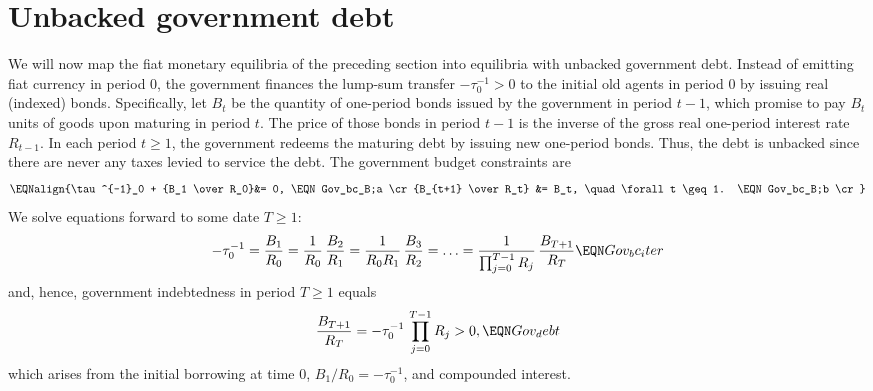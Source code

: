 

 \section{Unbacked government debt}
We will now map the fiat monetary equilibria of the preceding section 
into equilibria with unbacked government debt. Instead of emitting  
fiat currency in period $0$, the government finances the lump-sum transfer 
$-\tau^{-1}_0 >0$ to the initial old agents in period $0$ by 
issuing real (indexed) bonds. Specifically, let $B_{t}$ be the quantity of 
one-period bonds issued by the government in period $t-1$, 
which promise to pay $B_{t}$ units of goods upon maturing in period $t$. 
The price of those bonds in period $t-1$ is the inverse of the gross 
real one-period interest rate $R_{t-1}$. In each period $t \geq 1$, 
the government redeems the maturing debt by issuing new one-period bonds. 
Thus, the debt is unbacked since there are never any taxes levied to service 
the debt. The government budget constraints are 
$$\EQNalign{\tau^{-1}_0 + {B_1 \over R_0}&= 0,    \EQN Gov_bc_B;a \cr
                     {B_{t+1} \over R_t} &= B_t,  \quad \forall t \geq 1. 
                                                  \EQN Gov_bc_B;b \cr} $$
We solve equations  forward to some date $T\geq 1$:
$$ -\tau^{-1}_0 = {B_1 \over R_0} = {1 \over R_0}\, {B_2 \over R_1}
= {1 \over R_0 R_1} \,{B_3 \over R_2 } = \ldots 
= {1 \over \prod_{j=0}^{T-1} R_j}\, {B_{T+1} \over R_{T} }   \EQN Gov_bc_iter
$$
and, hence, government indebtedness in period $T\geq 1$ equals
$$ {B_{T+1} \over R_{T} } = -\tau^{-1}_0 \, \prod_{j=0}^{T-1} R_j > 0, \EQN Gov_debt
$$
which arises from the initial borrowing at time 0, $B_1/R_0=-\tau^{-1}_0$,
and compounded interest.

